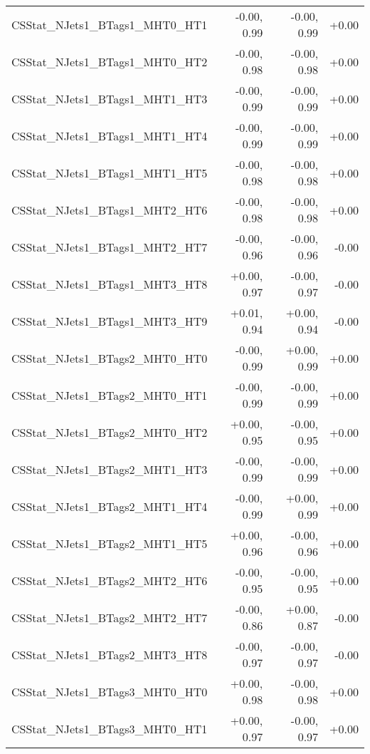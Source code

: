 \begin{tabular}{|l|r|r|r|}
CSStat\_NJets1\_BTags1\_MHT0\_HT1        &      -0.00, 0.99 &     -0.00, 0.99 &  +0.00 \\
CSStat\_NJets1\_BTags1\_MHT0\_HT2        &      -0.00, 0.98 &     -0.00, 0.98 &  +0.00 \\
CSStat\_NJets1\_BTags1\_MHT1\_HT3        &      -0.00, 0.99 &     -0.00, 0.99 &  +0.00 \\
CSStat\_NJets1\_BTags1\_MHT1\_HT4        &      -0.00, 0.99 &     -0.00, 0.99 &  +0.00 \\
CSStat\_NJets1\_BTags1\_MHT1\_HT5        &      -0.00, 0.98 &     -0.00, 0.98 &  +0.00 \\
CSStat\_NJets1\_BTags1\_MHT2\_HT6        &      -0.00, 0.98 &     -0.00, 0.98 &  +0.00 \\
CSStat\_NJets1\_BTags1\_MHT2\_HT7        &      -0.00, 0.96 &     -0.00, 0.96 &  -0.00 \\
CSStat\_NJets1\_BTags1\_MHT3\_HT8        &      +0.00, 0.97 &     -0.00, 0.97 &  -0.00 \\
CSStat\_NJets1\_BTags1\_MHT3\_HT9        &      +0.01, 0.94 &     +0.00, 0.94 &  -0.00 \\
CSStat\_NJets1\_BTags2\_MHT0\_HT0        &      -0.00, 0.99 &     +0.00, 0.99 &  +0.00 \\
CSStat\_NJets1\_BTags2\_MHT0\_HT1        &      -0.00, 0.99 &     -0.00, 0.99 &  +0.00 \\
CSStat\_NJets1\_BTags2\_MHT0\_HT2        &      +0.00, 0.95 &     -0.00, 0.95 &  +0.00 \\
CSStat\_NJets1\_BTags2\_MHT1\_HT3        &      -0.00, 0.99 &     -0.00, 0.99 &  +0.00 \\
CSStat\_NJets1\_BTags2\_MHT1\_HT4        &      -0.00, 0.99 &     +0.00, 0.99 &  +0.00 \\
CSStat\_NJets1\_BTags2\_MHT1\_HT5        &      +0.00, 0.96 &     -0.00, 0.96 &  +0.00 \\
CSStat\_NJets1\_BTags2\_MHT2\_HT6        &      -0.00, 0.95 &     -0.00, 0.95 &  +0.00 \\
CSStat\_NJets1\_BTags2\_MHT2\_HT7        &      -0.00, 0.86 &     +0.00, 0.87 &  -0.00 \\
CSStat\_NJets1\_BTags2\_MHT3\_HT8        &      -0.00, 0.97 &     -0.00, 0.97 &  -0.00 \\
CSStat\_NJets1\_BTags3\_MHT0\_HT0        &      +0.00, 0.98 &     -0.00, 0.98 &  +0.00 \\
CSStat\_NJets1\_BTags3\_MHT0\_HT1        &      +0.00, 0.97 &     -0.00, 0.97 &  +0.00 \\

\end{tabular}
